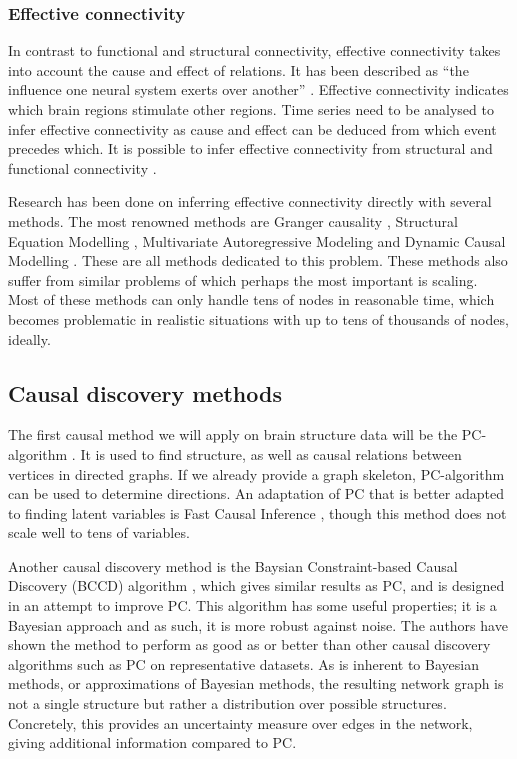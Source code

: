 \documentclass[a4paper, 10pt, english, twocolumn]{article}
\begin{document}
\subsubsection*{Effective connectivity}
In contrast to functional and structural connectivity, effective connectivity takes into account the cause and effect of relations.
It has been described as ``the influence one neural system exerts over another'' \cite{friston1994}.
Effective connectivity indicates which brain regions stimulate other regions.
Time series need to be analysed to infer effective connectivity as cause and effect can be deduced from which event precedes which. 
It is possible to infer effective connectivity from structural and functional connectivity \cite{mclntosh1994, harrison2003, friston2003, roebroeck2005}.

Research has been done on inferring effective connectivity directly with several methods.
The most renowned methods are Granger causality \cite{roebroeck2005}, Structural Equation Modelling \cite{mclntosh1994}, Multivariate Autoregressive Modeling \cite{harrison2003} and Dynamic Causal Modelling \cite{friston2003}.
These are all methods dedicated to this problem.
These methods also suffer from similar problems of which perhaps the most important is scaling.
Most of these methods can only handle tens of nodes in reasonable time, which becomes problematic in realistic situations with up to tens of thousands of nodes, ideally.

\subsection*{Causal discovery methods}
The first causal method we will apply on brain structure data will be the PC-algorithm \cite{spirtes2000}.
It is used to find structure, as well as causal relations between vertices in directed graphs. 
If we already provide a graph skeleton, PC-algorithm can be used to determine directions.
An adaptation of PC that is better adapted to finding latent variables is Fast Causal Inference \cite{spirtes2000}, though this method does not scale well to tens of variables.

Another causal discovery method is the Baysian Constraint-based Causal Discovery (BCCD) algorithm \cite{claassen2012}, which gives similar results as PC, and is designed in an attempt to improve PC.
This algorithm has some useful properties; it is a Bayesian approach and as such, it is more robust against noise.
The authors have shown the method to perform as good as or better than other causal discovery algorithms such as PC on representative datasets.
As is inherent to Bayesian methods, or approximations of Bayesian methods, the resulting network graph is not a  single structure but rather a distribution over possible structures.
Concretely, this provides an uncertainty measure over edges in the network, giving additional information compared to PC.
\end{document}
